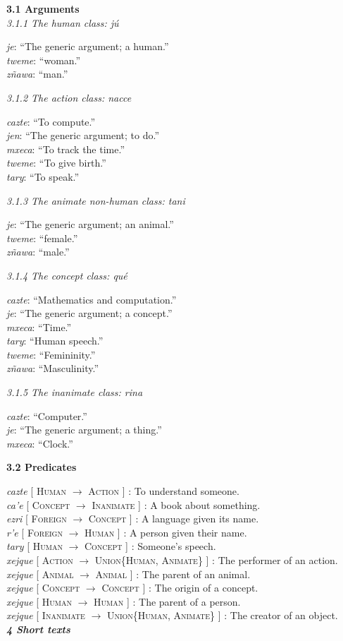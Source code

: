\documentclass{article}[10pt]
\newcommand{\define}[4]{\emph{#1} [ \textsc{#2} $\rightarrow$ \textsc{#3} ] : #4. \\}
\newcommand{\defarg}[2]{\emph{#1}: ``#2.''\\}
\begin{document}
{\bf 3.1 Arguments}\\

\emph{3.1.1 The human class: \emph{j\'{u}}}
\begin{multicols}{3}
\noindent
\defarg{je}{The generic argument; a human}
\defarg{tweme}{woman}
\defarg{z\~{n}awa}{man}
\end{multicols}

\emph{3.1.2 The action class: \emph{nacce}}
\begin{multicols}{3}
\noindent
\defarg{cazte}{To compute}
\defarg{jen}{The generic argument; to do}
\defarg{mxeca}{To track the time}
\defarg{tweme}{To give birth}
\defarg{tary}{To speak}
\end{multicols}

\emph{3.1.3 The animate non-human class: \emph{tani}}
\begin{multicols}{3}
\noindent
\defarg{je}{The generic argument; an animal}
\defarg{tweme}{female}
\defarg{z\~{n}awa}{male}
\end{multicols}

\emph{3.1.4 The concept class: \emph{qu\'{e}}}
\begin{multicols}{3}
\noindent
\defarg{cazte}{Mathematics and computation}
\defarg{je}{The generic argument; a concept}
\defarg{mxeca}{Time}
\defarg{tary}{Human speech}
\defarg{tweme}{Femininity}
\defarg{z\~{n}awa}{Masculinity}
\end{multicols}

\emph{3.1.5 The inanimate class: \emph{rina}}
\begin{multicols}{3}
\noindent
\defarg{cazte}{Computer}
\defarg{je}{The generic argument; a thing}
\defarg{mxeca}{Clock}
\end{multicols}

{\bf 3.2 Predicates}

\noindent
\define{cazte}{Human}{Action}{To understand someone}
\define{ca'e}{Concept}{Inanimate}{A book about something}
\define{ezri}{Foreign}{Concept}{A language given its name}
\define{r'e}{Foreign}{Human}{A person given their name}
\define{tary}{Human}{Concept}{Someone's speech}
\define{xejque}{Action}{Union\{Human, Animate\}}{The performer of an action}
\define{xejque}{Animal}{Animal}{The parent of an animal}
\define{xejque}{Concept}{Concept}{The origin of a concept}
\define{xejque}{Human}{Human}{The parent of a person}
\define{xejque}{Inanimate}{Union\{Human, Animate\}}{The creator of an object}

\clearpage
{\bf \emph{4 Short texts}}\\
\end{document}
